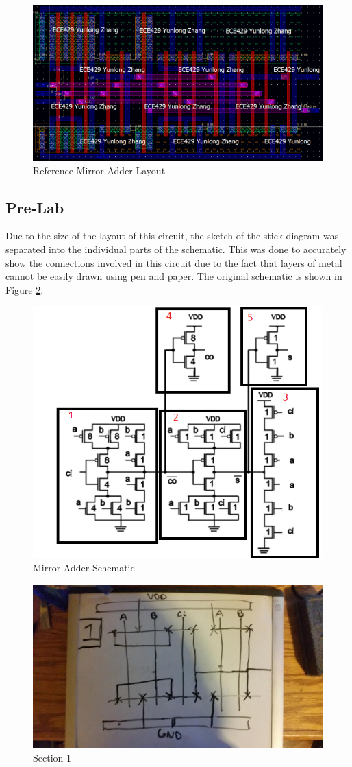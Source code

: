 \documentclass[12pt]{article}
\begin{document}
\begin{figure}[H]
\centering
\includegraphics[width=\linewidth]{ref}
\caption{Reference Mirror Adder Layout}
\label{fig:ref}
\end{figure}

\subsection{Pre-Lab}
Due to the size of the layout of this circuit, the sketch of the stick diagram was separated into the individual parts of the schematic. This was done to accurately show the connections involved in this circuit due to the fact that layers of metal cannot be easily drawn using pen and paper. The original schematic is shown in Figure \ref{fig:mirror-schemat}.
\begin{figure}[H]
\centering
\includegraphics[width=0.7\linewidth]{mirror-schemat}
\caption{Mirror Adder Schematic}
\label{fig:mirror-schemat}
\end{figure}


\begin{figure}[H]
\centering
\includegraphics[width=0.7\linewidth]{pre-1}
\caption{Section 1}
\label{fig:pre-1}
\end{figure}
\end{document}
